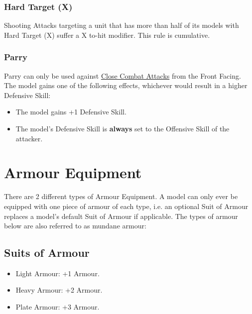 \subsubsection{Hard Target (X)}
\idx[main=y]{\hardtarget}\label{hard_target}

Shooting Attacks targeting a unit that has more than half of its models with Hard Target (X) suffer a \minuss{}X to-hit modifier. This rule is cumulative.

\subsubsection{Parry}
\idx[main=y]{\parry}\label{parry}

Parry can only be used against \hyperref[melee_attacks]{Close Combat Attacks} from the Front Facing. The model gains one of the following effects, whichever would result in a higher Defensive Skill:
\begin{itemize}
\item The model gains +1 Defensive Skill.
\item The model's Defensive Skill is \textbf{always} set to the Offensive Skill of the attacker.
\end{itemize}

\section{Armour Equipment}
\label{armour_equipment}

There are 2 different types of Armour Equipment. A model can only ever be equipped with one piece of armour of each type, i.e. an optional Suit of Armour replaces a model's default Suit of Armour if applicable. The types of armour below are also referred to as mundane armour:

\subsection{Suits of Armour}

\begin{itemize}
\item {}Light Armour: +1 Armour.
\item {}Heavy Armour: +2 Armour.
\item {}Plate Armour: +3 Armour.
\end{itemize}

